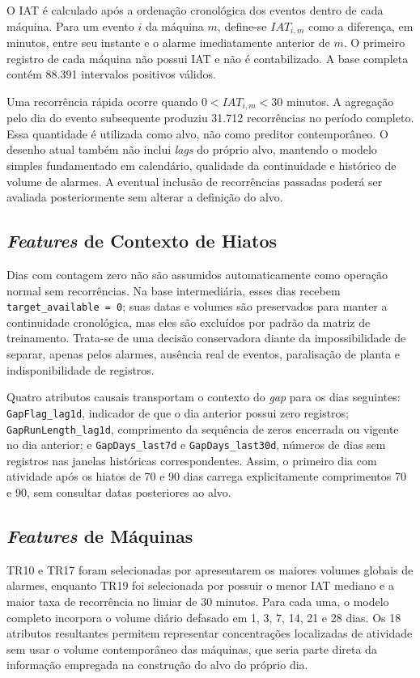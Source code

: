 O IAT é calculado após a ordenação cronológica dos eventos dentro de cada máquina. Para um evento $i$ da máquina $m$, define-se $IAT_{i,m}$ como a diferença, em minutos, entre seu instante e o alarme imediatamente anterior de $m$. O primeiro registro de cada máquina não possui IAT e não é contabilizado. A base completa contém 88.391 intervalos positivos válidos.

Uma recorrência rápida ocorre quando $0 < IAT_{i,m} < 30$ minutos. A agregação pelo dia do evento subsequente produziu 31.712 recorrências no período completo. Essa quantidade é utilizada como alvo, não como preditor contemporâneo. O desenho atual também não inclui \textit{lags} do próprio alvo, mantendo o modelo simples fundamentado em calendário, qualidade da continuidade e histórico de volume de alarmes. A eventual inclusão de recorrências passadas poderá ser avaliada posteriormente sem alterar a definição do alvo.

\subsection{\textit{Features} de Contexto de Hiatos}

Dias com contagem zero não são assumidos automaticamente como operação normal sem recorrências. Na base intermediária, esses dias recebem \texttt{target\_available = 0}; suas datas e volumes são preservados para manter a continuidade cronológica, mas eles são excluídos por padrão da matriz de treinamento. Trata-se de uma decisão conservadora diante da impossibilidade de separar, apenas pelos alarmes, ausência real de eventos, paralisação de planta e indisponibilidade de registros.

Quatro atributos causais transportam o contexto do \textit{gap} para os dias seguintes: \texttt{GapFlag\_lag1d}, indicador de que o dia anterior possui zero registros; \texttt{GapRunLength\_lag1d}, comprimento da sequência de zeros encerrada ou vigente no dia anterior; e \texttt{GapDays\_last7d} e \texttt{GapDays\_last30d}, números de dias sem registros nas janelas históricas correspondentes. Assim, o primeiro dia com atividade após os hiatos de 70 e 90 dias carrega explicitamente comprimentos 70 e 90, sem consultar datas posteriores ao alvo.

\subsection{\textit{Features} de Máquinas}

TR10 e TR17 foram selecionadas por apresentarem os maiores volumes globais de alarmes, enquanto TR19 foi selecionada por possuir o menor IAT mediano e a maior taxa de recorrência no limiar de 30 minutos. Para cada uma, o modelo completo incorpora o volume diário defasado em 1, 3, 7, 14, 21 e 28 dias. Os 18 atributos resultantes permitem representar concentrações localizadas de atividade sem usar o volume contemporâneo das máquinas, que seria parte direta da informação empregada na construção do alvo do próprio dia.

